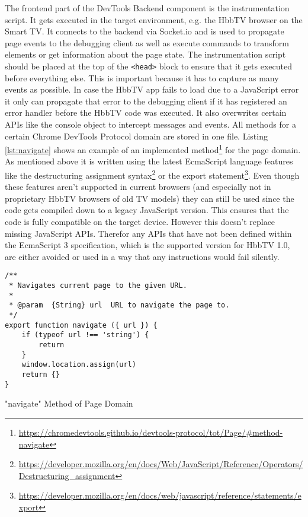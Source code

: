 The frontend part of the DevTools Backend component is the instrumentation script. It gets executed in the target environment, e.g. the HbbTV browser on the Smart TV. It connects to the backend via Socket.io and is used to propagate page events to the debugging client as well as execute commands to transform elements or get information about the page state. The instrumentation script should be placed at the top of the \texttt{<head>} block to ensure that it gets executed before everything else. This is important because it has to capture as many events as possible. In case the HbbTV app fails to load due to a JavaScript error it only can propagate that error to the debugging client if it has registered an error handler before the HbbTV code was executed. It also overwrites certain APIs like the console object to intercept messages and events. All methods for a certain Chrome DevTools Protocol domain are stored in one file. Listing \ref{lst:navigate} shows an example of an implemented method\footnote{\url{https://chromedevtools.github.io/devtools-protocol/tot/Page/\#method-navigate}} for the page domain. As mentioned above it is written using the latest EcmaScript language features like the destructuring assignment syntax\footnote{\url{https://developer.mozilla.org/en/docs/Web/JavaScript/Reference/Operators/Destructuring_assignment}} or the export statement\footnote{\url{https://developer.mozilla.org/en/docs/web/javascript/reference/statements/export}}. Even though these features aren't supported in current browsers (and especially not in proprietary HbbTV browsers of old TV models) they can still be used since the code gets compiled down to a legacy JavaScript version. This ensures that the code is fully compatible on the target device. However this doesn't replace missing JavaScript APIs. Therefor any APIs that have not been defined within the EcmaScript 3 specification, which is the supported version for HbbTV 1.0, are either avoided or used in a way that any instructions would fail silently.

\begin{listing}[H]
\begin{verbatim}
/**
 * Navigates current page to the given URL.
 *
 * @param  {String} url  URL to navigate the page to.
 */
export function navigate ({ url }) {
    if (typeof url !== 'string') {
        return
    }
    window.location.assign(url)
    return {}
}
\end{verbatim}
\caption{"navigate" Method of Page Domain}
\label{lst:navigate}
\end{listing}

